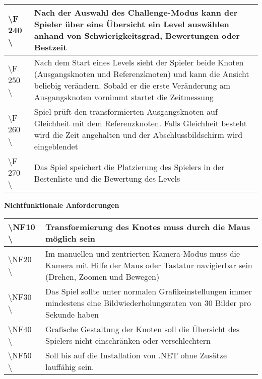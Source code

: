 \documentclass[10pt]{article}
\begin{document}
\begin{tabular}{|p{}|p{}|}
\hline
\textbackslash F 240  \textbackslash  & Nach der Auswahl des Challenge-Modus kann der Spieler über eine Übersicht ein Level auswählen anhand von Schwierigkeitsgrad, Bewertungen oder Bestzeit \\
\hline
\textbackslash F 250  \textbackslash  & Nach dem Start eines Levels sieht der Spieler beide Knoten (Ausgangsknoten und Referenzknoten) und kann die Ansicht beliebig verändern. Sobald er die erste Veränderung am Ausgangsknoten vornimmt startet die Zeitmessung\\
\hline
\textbackslash F 260  \textbackslash  & Spiel prüft den transformierten Ausgangsknoten auf Gleichheit mit dem Referenzknoten. Falls Gleichheit besteht wird die Zeit angehalten und der Abschlussbildschirm wird eingeblendet \\
\hline
\textbackslash F 270  \textbackslash  & Das Spiel speichert die Platzierung des Spielers in der Bestenliste und die Bewertung des Levels\\
\hline
\end{tabular} 

\newpage
\textbf{Nichtfunktionale Anforderungen}\\
\begin{tabular}{|p{}|p{}|}
\hline 
\textbackslash NF10  \textbackslash & Transformierung des Knotes muss durch die Maus möglich sein\\ 
\hline 
\textbackslash NF20  \textbackslash & Im manuellen und zentrierten Kamera-Modus muss die Kamera mit Hilfe der Maus oder Tastatur navigierbar sein (Drehen, Zoomen und Bewegen)\\ 
\hline 
\textbackslash NF30  \textbackslash & Das Spiel sollte unter normalen Grafikeinstellungen immer mindestens eine Bildwiederholungsraten von 30 Bilder pro Sekunde haben\\ 
\hline 
\textbackslash NF40  \textbackslash & Grafische Gestaltung der Knoten soll die Übersicht des Spielers nicht einschränken oder verschlechtern\\ 
\hline 
\textbackslash NF50  \textbackslash & Soll bis auf die Installation von .NET ohne Zusätze lauffähig sein.\\ 
\hline 
\end{tabular} 
\end{document}
